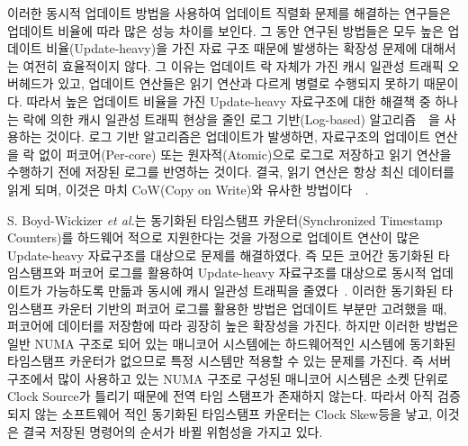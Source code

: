 이러한 동시적 업데이트 방법을 사용하여 업데이트 직렬화 문제를 해결하는 연구들은 
업데이트 비율에 따라 많은 성능 차이를 보인다.
그 동안 연구된 방법들은 모두 높은 업데이트 비율(Update-heavy)을 가진 자료 구조 때문에 발생하는 
확장성 문제에 대해서는 여전히 효율적이지 않다.
그 이유는 업데이트 락 자체가 가진 캐시 일관성 트래픽 오버헤드가 있고, 업데이트 연산들은 읽기 연산과 
다르게 병렬로 수행되지 못하기 때문이다.
따라서 높은 업데이트 비율을 가진 Update-heavy 자료구조에 대한 해결책 중 하나는 락에 의한 캐시 일관성 트래픽 
현상을 줄인 로그 기반(Log-based) 알고리즘~\cite{Hendler2010FC}~\cite{SilasBoydWickizerPth}을
사용하는 것이다.
로그 기반 알고리즘은 업데이트가 발생하면, 자료구조의 업데이트 연산을 
락 없이 퍼코어(Per-core) 또는 원자적(Atomic)으로 로그로 저장하고
읽기 연산을 수행하기 전에 저장된 로그를 반영하는 것이다.
결국, 읽기 연산은 항상 최신 데이터를 읽게 되며, 이것은 마치 CoW(Copy on Write)와
유사한 방법이다~\cite{PaulDetailLWN}~\cite{Morrison2016SSM}.

S. Boyd-Wickizer \textit{et al.}는 동기화된 타임스탬프 카운터(Synchronized Timestamp
Counters)를 하드웨어 적으로 지원한다는 것을 가정으로 업데이트 연산이 많은 Update-heavy 자료구조를 
대상으로 문제를 해결하였다.
즉 모든 코어간 동기화된 타임스탬프와 퍼코어 로그를 활용하여 Update-heavy 자료구조를 대상으로 
동시적 업데이트가 가능하도록 만듦과 동시에 캐시 일관성 트래픽을 줄였다~\cite{SilasBoydWickizerPth}.
이러한 동기화된 타임스탬프 카운터 기반의 퍼코어 로그를 활용한 방법은
업데이트 부분만 고려했을 때, 퍼코어에 데이터를 저장함에 따라 굉장히 높은 확장성을 가진다.
하지만 이러한 방법은 일반 NUMA 구조로 되어 있는 매니코어 시스템에는 
하드웨어적인 시스템에 동기화된 타임스탬프 카운터가 없으므로 특정 시스템만 적용할 수 있는 문제를 가진다. 
즉 서버 구조에서 많이 사용하고 있는 NUMA 구조로 구성된 매니코어 시스템은 소켓 단위로 Clock Source가 
틀리기 때문에 전역 타임 스탬프가 존재하지 않는다. 
따라서 아직 검증되지 않는 소프트웨어 적인 동기화된 타임스탬프 카운터는 Clock Skew등을 낳고, 
이것은 결국 저장된 명령어의 순서가 바뀔 위험성을 가지고 있다.

